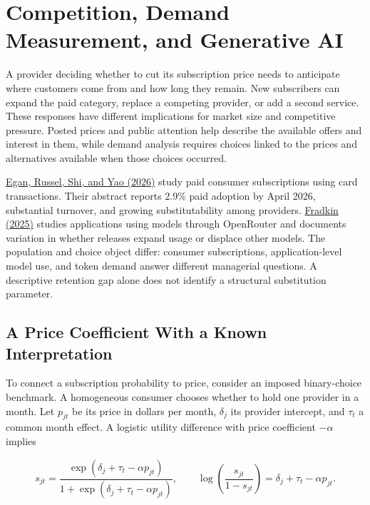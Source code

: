 \hypertarget{M08-competition-demand-measurement-and-generative-ai}{%
\section{Competition, Demand Measurement, and Generative
AI}\label{M08-competition-demand-measurement-and-generative-ai}}

\noindent A provider deciding whether to cut its subscription price needs to
anticipate where customers come from and how long they remain. New
subscribers can expand the paid category, replace a competing provider,
or add a second service. These responses have different implications for
market size and competitive pressure. Posted prices and public attention
help describe the available offers and interest in them, while demand
analysis requires choices linked to the prices and alternatives
available when those choices occurred.

\href{https://www.nber.org/papers/w35953}{Egan, Russel, Shi, and Yao
(2026)} study paid consumer subscriptions using card transactions. Their
abstract reports 2.9\% paid adoption by April 2026, substantial
turnover, and growing substitutability among providers.
\href{https://arxiv.org/abs/2504.15440}{Fradkin (2025)} studies
applications using models through OpenRouter and documents variation in
whether releases expand usage or displace other models. The population
and choice object differ: consumer subscriptions, application-level
model use, and token demand answer different managerial questions. A
descriptive retention gap alone does not identify a structural
substitution parameter.

\hypertarget{M08-a-price-coefficient-with-a-known-interpretation}{%
\subsection{A Price Coefficient With a Known
Interpretation}\label{M08-a-price-coefficient-with-a-known-interpretation}}

\noindent To connect a subscription probability to price, consider an imposed
binary-choice benchmark. A homogeneous consumer chooses whether to hold
one provider in a month. Let \(p_{jt}\) be its price in dollars per
month, \(\delta_j\) its provider intercept, and \(\tau_t\) a common
month effect. A logistic utility difference with price coefficient
\(-\alpha\) implies

\[
s_{jt}=\frac{\exp(\delta_j+\tau_t-\alpha p_{jt})}
{1+\exp(\delta_j+\tau_t-\alpha p_{jt})},
\qquad
\log\!\left(\frac{s_{jt}}{1-s_{jt}}\right)
=\delta_j+\tau_t-\alpha p_{jt}.
\]

